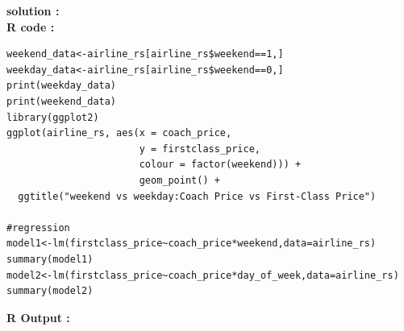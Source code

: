 \documentclass[11pt,a4paper]{article}
\begin{document}
\vspace{1em}
\newpage
\noindent \textbf{solution :}\\
\noindent\textbf{R code :}
\begin{codebox}
\begin{lstlisting}[style=Rstyle]
weekend_data<-airline_rs[airline_rs$weekend==1,]
weekday_data<-airline_rs[airline_rs$weekend==0,]
print(weekday_data)
print(weekend_data)
library(ggplot2)
ggplot(airline_rs, aes(x = coach_price,
                       y = firstclass_price,
                       colour = factor(weekend))) +
                       geom_point() +
  ggtitle("weekend vs weekday:Coach Price vs First-Class Price")

#regression
model1<-lm(firstclass_price~coach_price*weekend,data=airline_rs)
summary(model1)
model2<-lm(firstclass_price~coach_price*day_of_week,data=airline_rs)
summary(model2)
\end{lstlisting}
\end{codebox}
\vspace{0.5em}
\noindent \textbf{R Output :}
\end{document}
